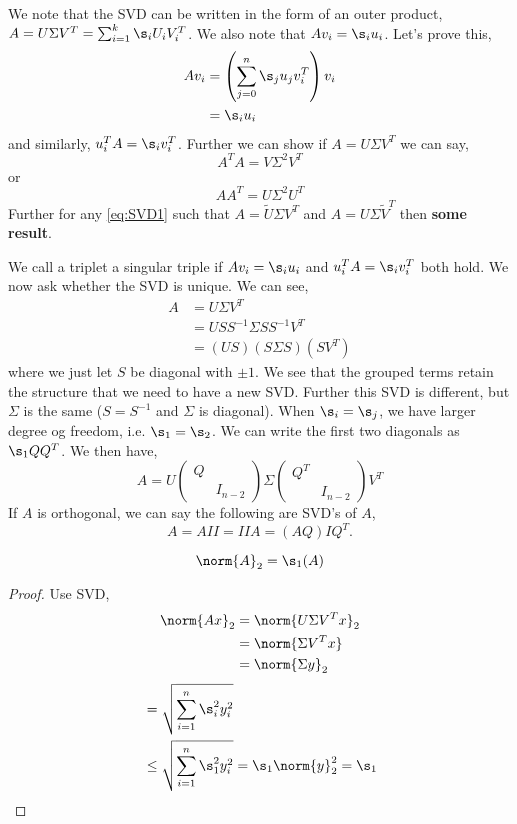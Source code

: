 
\noindent
We note that the SVD can be written in the form of an outer product, $A = U\Sigma V^T = \sum_{i=1}^k \s_i U_i V_i^T$. We also note that $Av_i = \s_i u_i$. Let's prove this,
\begin{align*}
  Av_i &= \left( \sum_{j=0}^n \s_j u_jv_i^T\right) v_i \\
  &= \s_i u_i
\end{align*}
and similarly, $u_i^T A = \s_i v_i^T$. Further we can show if $A = U \Sigma V^T$ we can say,
\begin{equation}
  A^TA = V\Sigma^2 V^T \label{eq:SVD1}
\end{equation}
or
\begin{equation}
  AA^T = U \Sigma^2 U^T \label{eq:SVD2}
\end{equation}
Further for any \ref{eq:SVD1} such that $A = \tilde U \Sigma V^T$ and $A = U\Sigma \tilde V^T$ then \textbf{some result}.

\noindent
We call a triplet a singular triple if $Av_i = \s_i u_i$ and $u_i^T A = \s_i v_i^T$ both hold. We now ask whether the SVD is unique. We can see,
\begin{align*}
  A &= U\Sigma V^T \\
  &= USS^{-1} \Sigma SS^{-1} V^T \\
  &= (US)(S\Sigma S)(SV^T)
\end{align*}
where we just let $S$ be diagonal with $\pm 1$. We see that the grouped terms retain the structure that we need to have a new SVD. Further this SVD is different, but $\Sigma$ is the same ($S = S^{-1}$ and $\Sigma$ is diagonal). When $\s_i = \s_j$, we have larger degree og freedom, i.e. $\s_1 = \s_2$. We can write the first two diagonals as $\s_1 QQ^T$. We then have,
$$ A = U \begin{pmatrix}
  Q & \\
  & I_{n-2}
\end{pmatrix} \Sigma \begin{pmatrix}
  Q^T & \\ & I_{n-2}
\end{pmatrix} V^T $$
If $A$ is orthogonal, we can say the following are SVD's of $A$,
$$ A = AII = IIA = (AQ)IQ^T. $$

\begin{nlemma}
  $$ \norm{A}_{2} = \s_1(A) $$
\end{nlemma}
\begin{proof}
  Use SVD,
  \begin{align*}
    \norm{Ax}_2 &= \norm{U \Sigma V^T x}_2 \\
    &= \norm{\Sigma V^T x} \\
    &= \norm{\Sigma y}_2 \\
  \end{align*}
  \begin{align*}
    &= \sqrt{\sum_{i=1}^n \s_i^2 y_i^2} \\
    &\le \sqrt{\sum_{i=1}^n \s_1^2 y_i^2} = \s_1\norm{y}_2^2 = \s_1
  \end{align*}
\end{proof}

